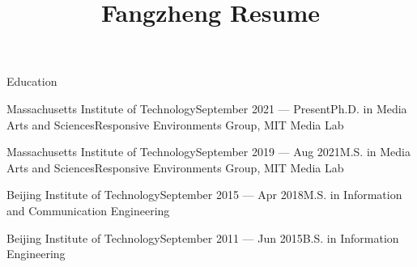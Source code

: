 \documentclass{resume} %
\begin{document}
\title{Fangzheng Resume}

\begin{rSection}{Education}

\begin{rSubsection}{Massachusetts Institute of Technology}{September 2021 --- Present}{Ph.D. in Media Arts and Sciences}{Responsive Environments Group, MIT Media Lab}
\vspace{-.65cm}
\item[]
\end{rSubsection}

\begin{rSubsection}{Massachusetts Institute of Technology}{September 2019 --- Aug 2021}{M.S. in Media Arts and Sciences}{Responsive Environments Group, MIT Media Lab}
\vspace{-.65cm}
\item[]
\end{rSubsection}

\begin{rSubsection}{Beijing Institute of Technology}{September 2015 --- Apr 2018}{M.S. in Information and Communication Engineering}{}
\vspace{-.65cm}
\item[]
\end{rSubsection}

\begin{rSubsection}{Beijing Institute of Technology}{September 2011 --- Jun 2015}{B.S. in Information Engineering}{}
\vspace{-.65cm}
\item[]
\end{rSubsection}

\end{rSection}

\end{document}
